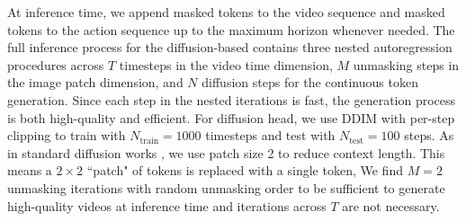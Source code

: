 At inference time, we append masked tokens to the video sequence and masked tokens to the action sequence up to the maximum horizon whenever needed. The full inference process for the diffusion-based \ourshort contains three nested autoregression procedures across $T$ timesteps in the video time dimension, $M$ unmasking steps in the image patch dimension, and  $N$ diffusion steps for the continuous token generation. Since each step in the nested iterations is fast, the generation process is both high-quality and efficient. For diffusion head, we use DDIM with per-step clipping \cite{song2020denoising} to train with $N_{\text{train}}=1000$ timesteps and test with $N_{\text{test}}=100$ steps. As in standard diffusion works \cite{peebles2023scalable}, we use patch size 2 to reduce context length. This means a $2\times2$ ``patch" of tokens is replaced with a single token, We find $M=2$ unmasking \cite{chang2022maskgit,li2024autoregressive} iterations with random unmasking order  to be sufficient to generate high-quality videos at inference time and iterations across $T$ are not necessary. 

 
